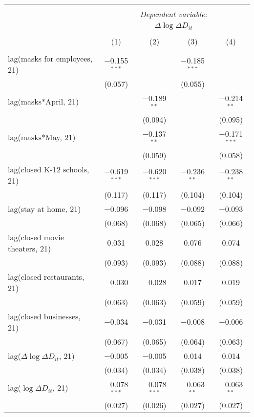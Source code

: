 \begin{tabular}{@{\extracolsep{1pt}}lcccc} 
\\[-1.8ex]\hline 
\hline \\[-1.8ex] 
 & \multicolumn{4}{c}{\textit{Dependent variable:}} \\ 
\cline{2-5} 
 & \multicolumn{4}{c}{$\Delta \log \Delta D_{it}$} \\ 
\\[-1.8ex] & (1) & (2) & (3) & (4)\\ 
\hline \\[-1.8ex] 
 lag(masks for employees, 21) & $-$0.155$^{***}$ &  & $-$0.185$^{***}$ &  \\ 
  & (0.057) &  & (0.055) &  \\ 
  lag(masks*April, 21) &  & $-$0.189$^{**}$ &  & $-$0.214$^{**}$ \\ 
  &  & (0.094) &  & (0.095) \\ 
  lag(masks*May, 21) &  & $-$0.137$^{**}$ &  & $-$0.171$^{***}$ \\ 
  &  & (0.059) &  & (0.058) \\ 
  lag(closed K-12 schools, 21) & $-$0.619$^{***}$ & $-$0.620$^{***}$ & $-$0.236$^{**}$ & $-$0.238$^{**}$ \\ 
  & (0.117) & (0.117) & (0.104) & (0.104) \\ 
  lag(stay at home, 21) & $-$0.096 & $-$0.098 & $-$0.092 & $-$0.093 \\ 
  & (0.068) & (0.068) & (0.065) & (0.066) \\ 
  lag(closed movie theaters, 21) & 0.031 & 0.028 & 0.076 & 0.074 \\ 
  & (0.093) & (0.093) & (0.088) & (0.088) \\ 
  lag(closed restaurants, 21) & $-$0.030 & $-$0.028 & 0.017 & 0.019 \\ 
  & (0.063) & (0.063) & (0.059) & (0.059) \\ 
  lag(closed businesses, 21) & $-$0.034 & $-$0.031 & $-$0.008 & $-$0.006 \\ 
  & (0.067) & (0.065) & (0.064) & (0.063) \\ 
  lag($\Delta \log \Delta D_{it}$, 21) & $-$0.005 & $-$0.005 & 0.014 & 0.014 \\ 
  & (0.034) & (0.034) & (0.038) & (0.038) \\ 
  lag($\log \Delta D_{it}$, 21) & $-$0.078$^{***}$ & $-$0.078$^{***}$ & $-$0.063$^{**}$ & $-$0.063$^{**}$ \\ 
  & (0.027) & (0.026) & (0.027) & (0.027) \\ 

\end{tabular}
